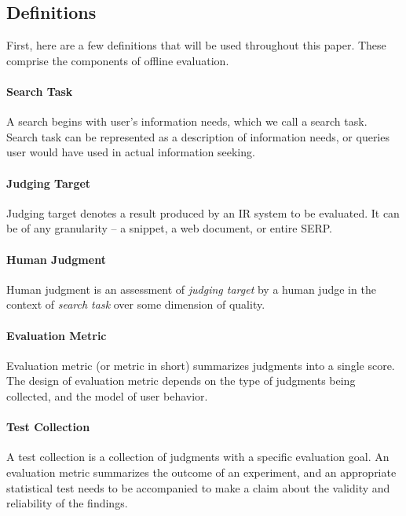 \subsection{Definitions}

First, here are a few definitions that will be used throughout this paper. These comprise the components of offline evaluation.

\paragraph{Search Task} A search begins with user's information needs, which we call a search task. Search task can be represented as a description of information needs, or queries user would have used in actual information seeking.

\paragraph{Judging Target} Judging target denotes a result produced by an IR system to be evaluated. It can be of any granularity -- a snippet, a web document, or entire SERP. 

\paragraph{Human Judgment} Human judgment is an assessment of \textit{judging target} by a human judge in the context of \textit{search task} over some dimension of quality. 

\paragraph{Evaluation Metric} Evaluation metric (or metric in short) summarizes judgments into a single score. The design of evaluation metric depends on the type of judgments being collected, and the model of user behavior.

\paragraph{Test Collection}  A test collection is a collection of judgments with a specific evaluation goal. An evaluation metric summarizes the outcome of an experiment, and an appropriate statistical test needs to be accompanied to make a claim about the validity and reliability of the findings.


